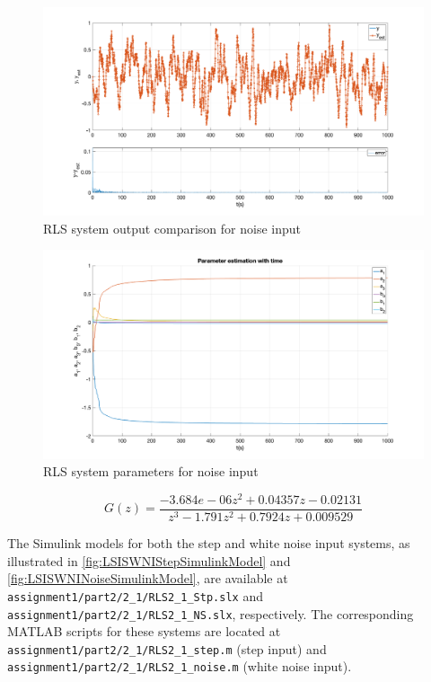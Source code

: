 \begin{figure}
	\centering
	\includegraphics[totalheight=8cm]{images/RLSISWNINoiseResponse.png}
	\caption{RLS system output comparison for noise input}
	\label{fig:RLSISWNINoiseResponse}
\end{figure}
\begin{figure}
	\centering
	\includegraphics[totalheight=8cm]{images/RLSISWNINoiseResponseParams.png}
	\caption{RLS system parameters for noise input}
	\label{fig:RLSISWNINoiseResponseParams}
\end{figure}
\begin{equation}
	G(z) =	\frac{-3.684e-06 z^2 + 0.04357 z - 0.02131}{z^3 - 1.791 z^2 + 0.7924 z + 0.009529}
	\label{eq:RLSISWNINoiseTransferFunction}
\end{equation}

The Simulink models for both the step and white noise input systems, as illustrated in \autoref{fig:LSISWNIStepSimulinkModel} and \autoref{fig:LSISWNINoiseSimulinkModel}, are available at \lstinline|assignment1/part2/2_1/RLS2_1_Stp.slx| and \lstinline|assignment1/part2/2_1/RLS2_1_NS.slx|, respectively. The corresponding MATLAB scripts for these systems are located at \lstinline|assignment1/part2/2_1/RLS2_1_step.m| (step input) and \lstinline|assignment1/part2/2_1/RLS2_1_noise.m| (white noise input).
